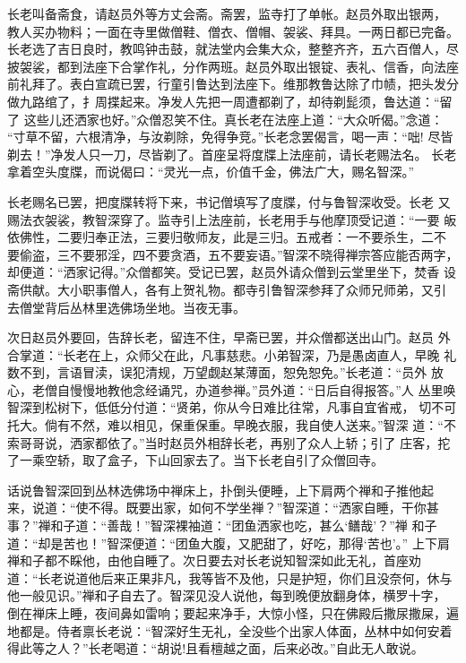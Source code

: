 长老叫备斋食，请赵员外等方丈会斋。斋罢，监寺打了单帐。赵员外取出银两，
教人买办物料；一面在寺里做僧鞋、僧衣、僧帽、袈裟、拜具。一两日都已完备。
长老选了吉日良时，教鸣钟击鼓，就法堂内会集大众，整整齐齐，五六百僧人，尽
披袈裟，都到法座下合掌作礼，分作两班。赵员外取出银锭、表礼、信香，向法座
前礼拜了。表白宣疏已罢，行童引鲁达到法座下。维那教鲁达除了巾帻，把头发分
做九路绾了，扌周揲起来。净发人先把一周遭都剃了，却待剃髭须，鲁达道：“留了
这些儿还洒家也好。”众僧忍笑不住。真长老在法座上道：“大众听偈。”念道：
“寸草不留，六根清净，与汝剃除，免得争竞。”长老念罢偈言，喝一声：“咄!
尽皆剃去！”净发人只一刀，尽皆剃了。首座呈将度牒上法座前，请长老赐法名。
长老拿着空头度牒，而说偈曰：“灵光一点，价值千金，佛法广大，赐名智深。”

长老赐名已罢，把度牒转将下来，书记僧填写了度牒，付与鲁智深收受。长老
又赐法衣袈裟，教智深穿了。监寺引上法座前，长老用手与他摩顶受记道：“一要
皈依佛性，二要归奉正法，三要归敬师友，此是三归。五戒者：一不要杀生，二不
要偷盗，三不要邪淫，四不要贪酒，五不要妄语。”智深不晓得禅宗答应能否两字，
却便道：“洒家记得。”众僧都笑。受记已罢，赵员外请众僧到云堂里坐下，焚香
设斋供献。大小职事僧人，各有上贺礼物。都寺引鲁智深参拜了众师兄师弟，又引
去僧堂背后丛林里选佛场坐地。当夜无事。

次日赵员外要回，告辞长老，留连不住，早斋已罢，并众僧都送出山门。赵员
外合掌道：“长老在上，众师父在此，凡事慈悲。小弟智深，乃是愚卤直人，早晚
礼数不到，言语冒渎，误犯清规，万望觑赵某薄面，恕免恕免。”长老道：“员外
放心，老僧自慢慢地教他念经诵咒，办道参禅。”员外道：“日后自得报答。”人
丛里唤智深到松树下，低低分付道：“贤弟，你从今日难比往常，凡事自宜省戒，
切不可托大。倘有不然，难以相见，保重保重。早晚衣服，我自使人送来。”智深
道：“不索哥哥说，洒家都依了。”当时赵员外相辞长老，再别了众人上轿；引了
庄客，拕了一乘空轿，取了盒子，下山回家去了。当下长老自引了众僧回寺。

话说鲁智深回到丛林选佛场中禅床上，扑倒头便睡，上下肩两个禅和子推他起
来，说道：“使不得。既要出家，如何不学坐禅？”智深道：“洒家自睡，干你甚
事？”禅和子道：“善哉！”智深裸袖道：“团鱼洒家也吃，甚么‘鳝哉’？”禅
和子道：“却是苦也！”智深便道：“团鱼大腹，又肥甜了，好吃，那得‘苦也’。”
上下肩禅和子都不睬他，由他自睡了。次日要去对长老说知智深如此无礼，首座劝
道：“长老说道他后来正果非凡，我等皆不及他，只是护短，你们且没奈何，休与
他一般见识。”禅和子自去了。智深见没人说他，每到晚便放翻身体，横罗十字，
倒在禅床上睡，夜间鼻如雷响；要起来净手，大惊小怪，只在佛殿后撒尿撒屎，遍
地都是。侍者禀长老说：“智深好生无礼，全没些个出家人体面，丛林中如何安着
得此等之人？”长老喝道：“胡说!且看檀越之面，后来必改。”自此无人敢说。

